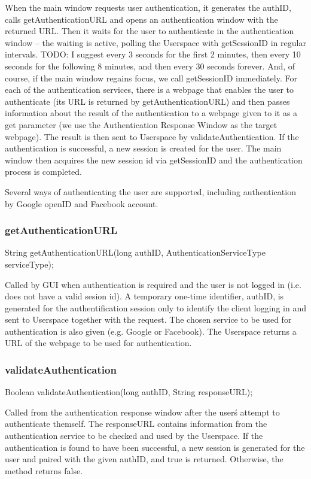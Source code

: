 When the main window requests user authentication, it generates the authID, calls getAuthenticationURL and opens an authentication window with the returned URL.
Then it waits for the user to authenticate in the authentication window
-- the waiting is active, polling the Userspace with getSessionID in regular intervals.
TODO: I suggest every 3 seconds for the first 2 minutes, then every 10 seconds for the following 8 minutes, and then every 30 seconds forever.
And, of course, if the main window regains focus, we call getSessionID immediately.
For each of the authentication services, there is a webpage that enables the user to authenticate
(its URL is returned by getAuthenticationURL)
and then passes information about the result of the authentication to a webpage given to it as a get parameter
(we use the Authentication Response Window as the target webpage).
The result is then sent to Userspace by validateAuthentication.
If the authentication is successful, a new session is created for the user.
The main window then acquires the new session id via getSessionID and the authentication process is completed.

Several ways of authenticating the user are supported, including authentication by Google openID and Facebook account.

\subsubsection{getAuthenticationURL}
    String getAuthenticationURL(long authID, AuthenticationServiceType serviceType);

Called by GUI when authentication is required and the user is not logged in (i.e. does not have a valid sesion id).
A temporary one-time identifier, authID, is generated for the authentification session only to identify the client logging in and sent to Userspace together with the request.
The chosen service to be used for authentication is also given (e.g. Google or Facebook).
The Userspace returns a URL of the webpage to be used for authentication.

\subsubsection{validateAuthentication}
    Boolean validateAuthentication(long authID, String responseURL);

Called from the authentication response window after the user\'s attempt to authenticate themself.
The responseURL contains information from the authentication service to be checked and used by the Userspace.
If the authentication is found to have been successful, a new session is generated for the user and paired with the given authID, and true is returned.
Otherwise, the method returns false.

